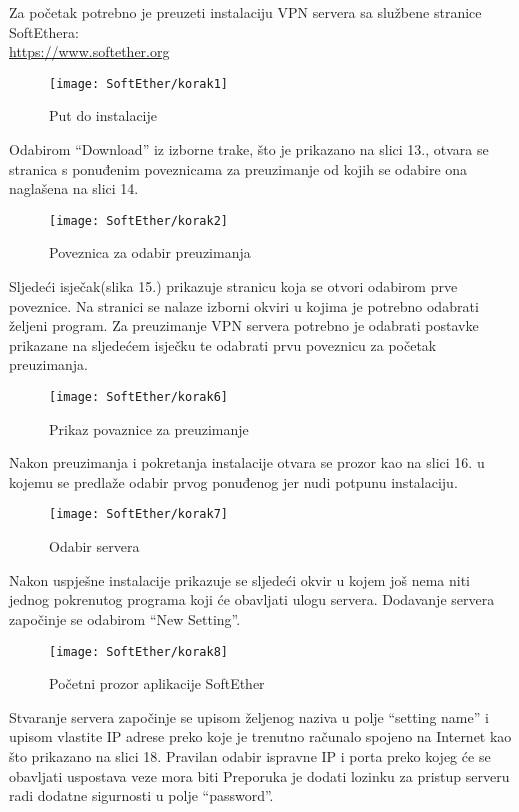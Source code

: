 \hfill \smallbreak
Za početak potrebno je preuzeti instalaciju VPN servera sa službene stranice SoftEthera:\\ \url{https://www.softether.org}
\begin{figure}[h!]
	\centering
     \texttt{[image: SoftEther/korak1]}
     \caption{Put do instalacije}
\end{figure}
\FloatBarrier
Odabirom ``Download'' iz izborne trake, što je prikazano na slici 13., otvara se stranica s ponuđenim poveznicama za preuzimanje od kojih se odabire ona naglašena na slici 14.
\begin{figure}[h!]
     \centering
     \texttt{[image: SoftEther/korak2]}
     \caption{Poveznica za odabir preuzimanja}
\end{figure}
\FloatBarrier
Sljedeći isječak(slika 15.) prikazuje stranicu koja se otvori odabirom prve poveznice. Na stranici se nalaze izborni okviri u kojima je potrebno odabrati željeni program. Za preuzimanje VPN servera potrebno je odabrati postavke prikazane na sljedećem isječku te odabrati prvu poveznicu za početak preuzimanja.
\begin{figure}[h!]
     \centering
     \texttt{[image: SoftEther/korak6]}
     \caption{Prikaz povaznice za preuzimanje}
\end{figure}
\FloatBarrier
Nakon preuzimanja i pokretanja instalacije otvara se prozor kao na slici 16. u kojemu se predlaže odabir prvog ponuđenog jer nudi potpunu instalaciju.
\begin{figure}[h!]
     \centering
     \texttt{[image: SoftEther/korak7]}
     \caption{Odabir servera}
\end{figure}
\FloatBarrier
Nakon uspješne instalacije prikazuje se sljedeći okvir u kojem još nema niti jednog pokrenutog programa koji će obavljati ulogu servera. Dodavanje servera započinje se odabirom ``New Setting''.
\begin{figure}[h!]
     \centering
     \texttt{[image: SoftEther/korak8]}
     \caption{Početni prozor aplikacije SoftEther}
\end{figure}
\FloatBarrier
Stvaranje servera započinje se upisom željenog naziva u polje ``setting name'' i upisom vlastite IP adrese preko koje je trenutno računalo spojeno na Internet kao što prikazano na slici 18. Pravilan odabir ispravne IP i porta preko kojeg će se obavljati uspostava veze mora biti 
Preporuka je dodati lozinku za pristup serveru radi dodatne sigurnosti u polje ``password''.
